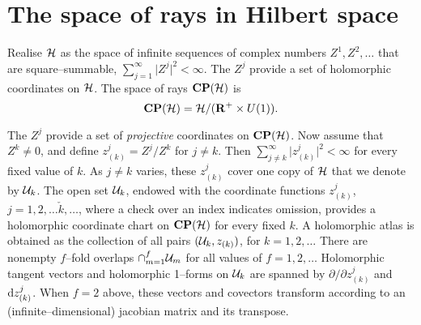 \documentclass[a4paper,a4paper]{article}
\begin{document}
\section{The space of rays in Hilbert space}\label{innter}


Realise ${\cal H}$ as the space of infinite sequences of complex numbers $Z^1, Z^2, \ldots$ that 
are square--summable, $\sum_{j=1}^{\infty}\vert Z^j\vert ^2 < \infty$. 
The $Z^j$ provide a set of holomorphic coordinates on ${\cal H}$. 
The space of rays ${\bf CP}({\cal H})$ is
\begin{equation}
{\bf CP}({\cal H})={\cal H}/({\bf R}^+\times U(1)).
\label{cph}
\end{equation}

The $Z^j$ provide a set of {\it projective}\/ coordinates on ${\bf CP}({\cal H})$.
Now assume that $Z^k\neq 0$, and define $z^j_{(k)}= Z^j/Z^k$ for $j\neq k$. Then 
$\sum_{j\neq k}^{\infty}\vert z^j_{(k)}\vert ^2 < \infty$ for every fixed 
value of $k$. As $j\neq k$ varies, these $z^j_{(k)}$ cover one copy of ${\cal H}$ 
that we denote by ${\cal U}_k$. The open set ${\cal U}_k$, endowed with 
the coordinate functions $z^j_{(k)}$, $j=1,2, \ldots \check k, \ldots$, 
where a check over an index indicates omission, provides a holomorphic coordinate chart 
on ${\bf CP}({\cal H})$ for every fixed $k$.
A holomorphic atlas is obtained as the collection of all pairs  $({\cal U}_k, 
z_{(k)})$, for $k=1, 2, \ldots$ There are nonempty $f$--fold overlaps $\cap_{m=1}^f {\cal U}_m$ 
for all values of $f=1, 2, \ldots$ Holomorphic tangent vectors and holomorphic 1--forms 
on ${\cal U}_k$ are spanned by $\partial/\partial z^j_{(k)}$ and ${\rm d}z^j_{(k)}$. 
When $f=2$ above, these vectors and covectors transform according to an 
(infinite--dimensional) jacobian matrix and its transpose.
\end{document}
